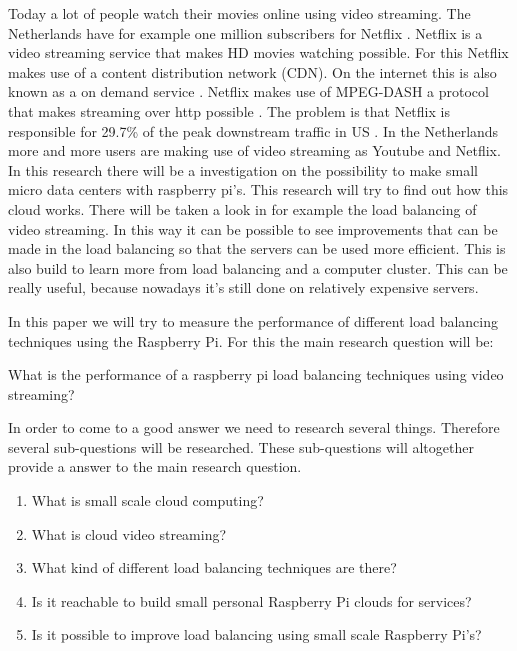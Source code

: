 \documentclass{sig-alternate-br}
\begin{document}
Today a lot of people watch their movies online using video streaming. The Netherlands have for example one million subscribers for Netflix \cite{volkskrant}. Netflix is a video streaming service that makes HD movies watching possible. For this Netflix makes use of a content distribution network (CDN). On the internet this is also known as a on demand service \cite{Adhikari:2012}. Netflix makes use of MPEG-DASH a protocol that makes streaming over http possible \cite{martin:2013}. The problem is that Netflix is responsible for  29.7\% of the peak downstream traffic in US  \cite{Adhikari:2012}. In the Netherlands more and more users are making use of video streaming as Youtube and Netflix. In this research there will be a investigation on the possibility to make small micro data centers with raspberry pi's. This research will try to find out how this cloud works. There will be taken a look in for example the load balancing of video streaming. In this way it can be possible to see improvements that can be made in the load balancing so that the servers can be used more efficient. This is also build to learn more from load balancing and a computer cluster. This can be really useful, because nowadays it's still done on relatively expensive servers. 

In this paper we will try to measure the performance of different load balancing techniques using the Raspberry Pi. For this the main research question will be: 
\begin{center}
 What is the performance of a raspberry pi load balancing techniques using video streaming?
\end{center}

In order to come to a good answer we need to  research several things. Therefore several sub-questions will be researched. These sub-questions will altogether provide a answer to the main research question. 

\begin{enumerate}
	\item What is small scale cloud computing?
	\item What is cloud video streaming?
	\item What kind of different load balancing techniques are there?
	\item Is it reachable to build small personal Raspberry Pi clouds for services?
	\item Is it possible to improve load balancing using small scale Raspberry Pi's? 
\end{enumerate}
\end{document}
